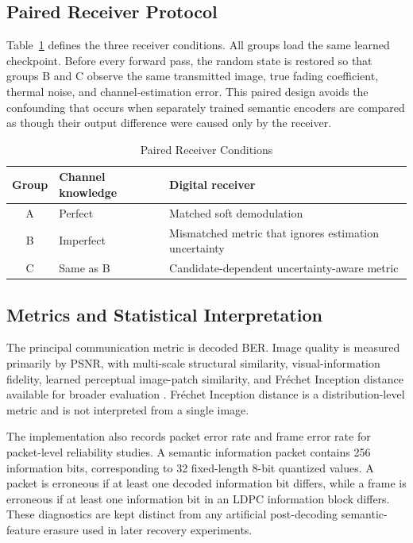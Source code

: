 \documentclass[conference]{IEEEtran}
\newcommand{\BER}{BER}
\newcommand{\PSNR}{PSNR}
\newcommand{\LDPC}{LDPC}
\begin{document}
\subsection{Paired Receiver Protocol}
Table~\ref{tab:groups} defines the three receiver conditions. All groups load the same learned checkpoint. Before every forward pass, the random state is restored so that groups B and C observe the same transmitted image, true fading coefficient, thermal noise, and channel-estimation error. This paired design avoids the confounding that occurs when separately trained semantic encoders are compared as though their output difference were caused only by the receiver.

\begin{table}[t]
\centering
\caption{Paired Receiver Conditions}
\label{tab:groups}
\begin{tabular}{c p{1.25cm} p{4.25cm}}
\toprule
Group & Channel knowledge & Digital receiver \\
\midrule
A & Perfect & Matched soft demodulation \\
B & Imperfect & Mismatched metric that ignores estimation uncertainty \\
C & Same as B & Candidate-dependent uncertainty-aware metric \\
\bottomrule
\end{tabular}
\end{table}

\subsection{Metrics and Statistical Interpretation}
The principal communication metric is decoded \BER{}. Image quality is measured primarily by \PSNR{}, with multi-scale structural similarity, visual-information fidelity, learned perceptual image-patch similarity, and Fr\'echet Inception distance available for broader evaluation \cite{wang2003msssim,sheikh2006vif,zhang2018lpips,heusel2017fid}. Fr\'echet Inception distance is a distribution-level metric and is not interpreted from a single image.

The implementation also records packet error rate and frame error rate for packet-level reliability studies. A semantic information packet contains 256 information bits, corresponding to 32 fixed-length 8-bit quantized values. A packet is erroneous if at least one decoded information bit differs, while a frame is erroneous if at least one information bit in an \LDPC{} information block differs. These diagnostics are kept distinct from any artificial post-decoding semantic-feature erasure used in later recovery experiments.
\end{document}
